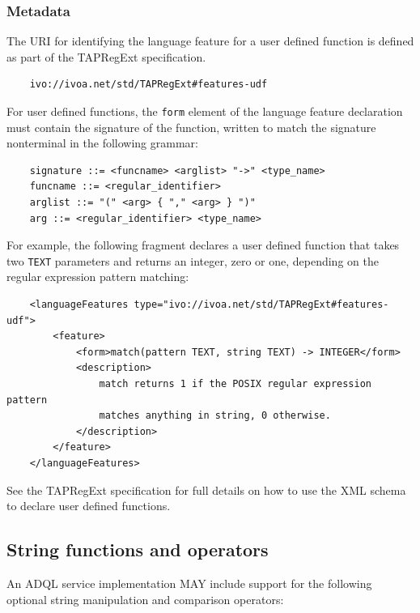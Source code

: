 \documentclass[11pt,a4paper]{ivoa}
\newcommand{\TAPRegExtSpec}{TAPRegExt specification\xspace}
\begin{document}

\subsubsection{Metadata}
\label{sec:user.metadata}

The URI for identifying the language feature for a user defined function
is defined as part of the \TAPRegExtSpec.

\begin{verbatim}
    ivo://ivoa.net/std/TAPRegExt#features-udf
\end{verbatim}

For user defined functions, the \verb:form: element of the language feature
declaration must contain the signature of the function, written to match
the signature nonterminal in the following grammar:
\begin{verbatim}
    signature ::= <funcname> <arglist> "->" <type_name>
    funcname ::= <regular_identifier>
    arglist ::= "(" <arg> { "," <arg> } ")"
    arg ::= <regular_identifier> <type_name>
\end{verbatim}

For example, the following fragment declares a user defined function that
takes two \verb:TEXT: parameters and returns an integer, zero or one,
depending on the regular expression pattern matching:
\begin{verbatim}
    <languageFeatures type="ivo://ivoa.net/std/TAPRegExt#features-udf">
        <feature>
            <form>match(pattern TEXT, string TEXT) -> INTEGER</form>
            <description>
                match returns 1 if the POSIX regular expression pattern
                matches anything in string, 0 otherwise.
            </description>
        </feature>
    </languageFeatures>
\end{verbatim}

See the \TAPRegExtSpec for full details on how to use the
XML schema to declare user defined functions.

\subsection{String functions and operators}
\label{sec:string.functions}

An ADQL service implementation MAY include support for the following optional
string manipulation and comparison operators:
\end{document}
